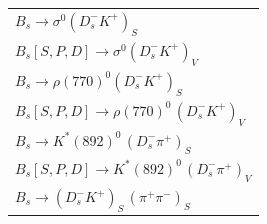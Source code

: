 \begin{table}[h]
\begin{tabular} {@{\hspace{0.5cm}}l@{\hspace{0.25cm}}}
              $B_s \to \sigma^{0} (D_s^- K^+)_S$ \\
              $B_s[S,P,D] \to \sigma^{0} (D_s^- K^+)_V$ \\
              $B_s \to \rho(770)^{0} (D_s^- K^+)_S$ \\
              $B_s[S,P,D] \to \rho(770)^{0} \, (D_s^- K^+)_V$\\
              $B_s \to  K^{*}(892)^{0} \, (D_s^- \pi^+)_S$ \\
              $B_s[S,P,D]  \to  K^{*}(892)^{0} \, (D_s^- \pi^+)_V$ \\
              $B_s \to (D_s^- K^+)_{S} \, (\pi^+ \pi^-)_{S}$ \\
              \hline \hline
           \end{tabular}
\end{table}


